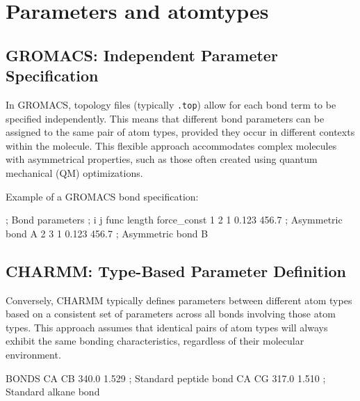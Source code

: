\documentclass[
]{article}
\newenvironment{Shaded}{}{}
\newcommand{\NormalTok}[1]{#1}
\begin{document}
\hypertarget{parameters-and-atomtypes}{%
\section{Parameters and atomtypes}\label{parameters-and-atomtypes}}

\hypertarget{gromacs-independent-parameter-specification}{%
\subsection{GROMACS: Independent Parameter
Specification}\label{gromacs-independent-parameter-specification}}

In GROMACS, topology files (typically \texttt{.top}) allow for each bond
term to be specified independently. This means that different bond
parameters can be assigned to the same pair of atom types, provided they
occur in different contexts within the molecule. This flexible approach
accommodates complex molecules with asymmetrical properties, such as
those often created using quantum mechanical (QM) optimizations.

Example of a GROMACS bond specification:

\begin{Shaded}
\begin{Highlighting}[]
\NormalTok{; Bond parameters}
\NormalTok{; i    j   func   length  force\_const}
\NormalTok{  1    2    1      0.123   456.7   ; Asymmetric bond A}
\NormalTok{  2    3    1      0.123   456.7   ; Asymmetric bond B}
\end{Highlighting}
\end{Shaded}

\hypertarget{charmm-type-based-parameter-definition}{%
\subsection{CHARMM: Type-Based Parameter
Definition}\label{charmm-type-based-parameter-definition}}

Conversely, CHARMM typically defines parameters between different atom
types based on a consistent set of parameters across all bonds involving
those atom types. This approach assumes that identical pairs of atom
types will always exhibit the same bonding characteristics, regardless
of their molecular environment.

\begin{Shaded}
\begin{Highlighting}[]
\NormalTok{BONDS}
\NormalTok{CA   CB   340.0  1.529   ; Standard peptide bond}
\NormalTok{CA   CG   317.0  1.510   ; Standard alkane bond}
\end{Highlighting}
\end{Shaded}
\end{document}
